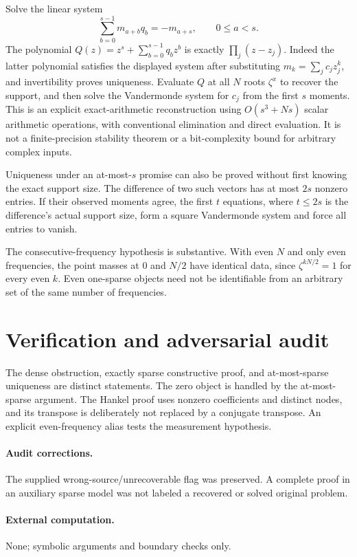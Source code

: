 \documentclass[11pt]{article}
\begin{document}
Solve the linear system
\[
 \sum_{b=0}^{s-1}m_{a+b}q_b=-m_{a+s},\qquad 0\leq a<s.
\]
The polynomial $Q(z)=z^s+\sum_{b=0}^{s-1}q_bz^b$ is exactly $\prod_j(z-z_j)$. Indeed the latter polynomial satisfies the displayed system after substituting $m_k=\sum_jc_jz_j^k$, and invertibility proves uniqueness. Evaluate $Q$ at all $N$ roots $\zeta^x$ to recover the support, and then solve the Vandermonde system for $c_j$ from the first $s$ moments. This is an explicit exact-arithmetic reconstruction using $O(s^3+Ns)$ scalar arithmetic operations, with conventional elimination and direct evaluation. It is not a finite-precision stability theorem or a bit-complexity bound for arbitrary complex inputs.

Uniqueness under an at-most-$s$ promise can also be proved without first knowing the exact support size. The difference of two such vectors has at most $2s$ nonzero entries. If their observed moments agree, the first $t$ equations, where $t\leq2s$ is the difference's actual support size, form a square Vandermonde system and force all entries to vanish.

The consecutive-frequency hypothesis is substantive. With even $N$ and only even frequencies, the point masses at $0$ and $N/2$ have identical data, since $\zeta^{kN/2}=1$ for every even $k$. Even one-sparse objects need not be identifiable from an arbitrary set of the same number of frequencies.
\section{Verification and adversarial audit}
The dense obstruction, exactly sparse constructive proof, and at-most-sparse uniqueness are distinct statements. The zero object is handled by the at-most-sparse argument. The Hankel proof uses nonzero coefficients and distinct nodes, and its transpose is deliberately not replaced by a conjugate transpose. An explicit even-frequency alias tests the measurement hypothesis.
\paragraph{Audit corrections.} The supplied wrong-source/unrecoverable flag was preserved. A complete proof in an auxiliary sparse model was not labeled a recovered or solved original problem.
\paragraph{External computation.} None; symbolic arguments and boundary checks only.
\end{document}
